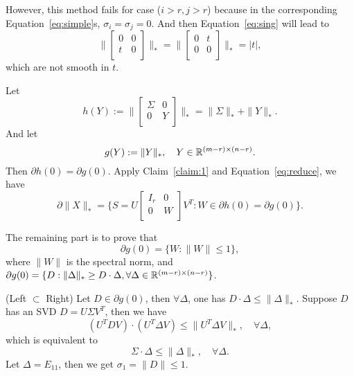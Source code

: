However,
this method fails for case ($i>r, j>r$)
because in the corresponding Equation~\eqref{eq:simple}s,
$\sigma_i=\sigma_j=0$.
And then Equation~\eqref{eq:sing} will lead to
\begin{equation}
    \bigg\|\begin{bmatrix}
        0 & 0 \\
        t & 0 \\
    \end{bmatrix}\bigg\|_*=
    \bigg\|\begin{bmatrix}
        0 & t \\
        0 & 0 \\
    \end{bmatrix}\bigg\|_*=|t|,
\end{equation}
which are not smooth in $t$.

Let
\begin{equation}
    h(Y):=\bigg\|\begin{bmatrix}
            \Sigma & 0 \\
            0      & Y \\
        \end{bmatrix}\bigg\|_*
        =\|\Sigma\|_*+\|Y\|_*.
\end{equation}
And let
\begin{equation}
    g(Y):=\|Y\|_*,\quad Y\in{\mathbb{R}}^{(m-r)\times(n-r)}.
\end{equation}
Then $\partial h(0)=\partial g(0)$.
Apply Claim~\ref{claim:1} and Equation~\eqref{eq:reduce},
we have
\begin{equation}
    \partial \|X\|_*=\bigg\{
        S=U\begin{bmatrix}
            I_r & 0 \\
            0   & W \\
        \end{bmatrix}V^T:W\in\partial h(0)=\partial g(0)
        \bigg\}.
\end{equation}

The remaining part is to prove that
\begin{equation}
    \partial g(0)=\{W:\|W\|\le1\},
\end{equation}
where $\|W\|$ is the spectral norm, and
$\partial g(0)=\{D:\|\Delta\|_*\ge D\cdot\Delta,
\forall\Delta\in{\mathbb{R}}^{(m-r)\times(n-r)}\}$.

(Left $\subset$ Right)
Let $D\in\partial g(0)$,
then $\forall\Delta$,
one has $D\cdot\Delta\le\|\Delta\|_*$.
Suppose $D$ has an SVD $D=U\Sigma V^T$,
then we have
\begin{equation}
    (U^TDV)\cdot(U^T\Delta V)\le\|U^T\Delta V\|_*,
    \quad\forall\Delta,
\end{equation}
which is equivalent to
\begin{equation}
    \Sigma\cdot\Delta\le\|\Delta\|_*,
    \quad\forall\Delta.
\end{equation}
Let $\Delta=E_{11}$,
then we get $\sigma_1=\|D\|\le1$.

